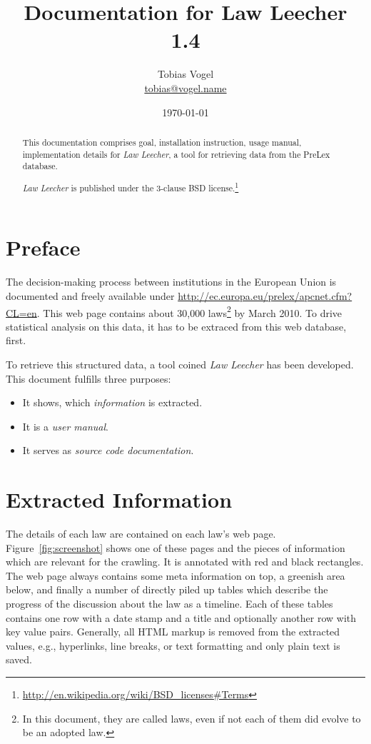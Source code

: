 \documentclass{scrartcl}
\newcommand{\theTitle}{Documentation for Law Leecher 1.4}
\newcommand{\theAuthor}{Tobias Vogel}
\begin{document}
\title{\theTitle}
\author{\theAuthor\\\url{tobias@vogel.name}}
\date{\today}

\maketitle

\begin{abstract}
This documentation comprises goal, installation instruction, usage manual, implementation details for \textit{Law Leecher}, a tool for retrieving data from the PreLex database.

\textit{Law Leecher} is published under the 3-clause BSD license.\footnote{\url{http://en.wikipedia.org/wiki/BSD_licenses\#Terms}}
\end{abstract}


\tableofcontents

\clearpage

\section{Preface}
The decision-making process between institutions in the European Union is documented and freely available under \url{http://ec.europa.eu/prelex/apcnet.cfm?CL=en}. This web page contains about 30,000 laws\footnote{In this document, they are called laws, even if not each of them did evolve to be an adopted law.} by March 2010. To drive statistical analysis on this data, it has to be extraced from this web database, first.

To retrieve this structured data, a tool coined \textit{Law Leecher} has been developed. This document fulfills three purposes:

\begin{itemize}
\item It shows, which \textit{information} is extracted.
\item It is a \textit{user manual}.
\item It serves as \textit{source code documentation}.
\end{itemize}



\section{Extracted Information}
The details of each law are contained on each law's web page. Figure~\ref{fig:screenshot} shows one of these pages and the pieces of information which are relevant for the crawling. It is annotated with red and black rectangles. The web page always contains some meta information on top, a greenish area below, and finally a number of directly piled up tables which describe the progress of the discussion about the law as a timeline. Each of these tables contains one row with a date stamp and a title and optionally another row with key value pairs. Generally, all HTML markup is removed from the extracted values, e.g., hyperlinks, line breaks, or text formatting and only plain text is saved.
\end{document}
